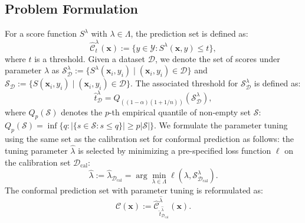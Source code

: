 \documentclass{article}
\newcommand{\C}{\mathcal{C}}
\newcommand{\1}{\mathbbm{1}}
\theoremstyle{plain}
\theoremstyle{definition}
\theoremstyle{remark}
\begin{document}
\subsection{Problem Formulation}
\label{subsec:tuning_bias}

For a score function $S^{\lambda}$ with $\lambda \in \Lambda$, the prediction set is defined as:
\begin{equation*}
    \widehat{\C}^{\lambda}_t(\boldsymbol{x}) := \{y \in \mathcal{Y} : S^\lambda(\boldsymbol{x},y) \leq t\},
\end{equation*}
where $t$ is a threshold. 
Given a dataset $\mathcal{D}$, we denote the set of scores under parameter $\lambda$ as $\mathcal{S}^{\lambda}_{\mathcal{D}} := \{S^\lambda(\boldsymbol{x}_i, y_i) \mid (\boldsymbol{x}_i, y_i) \in \mathcal{D}\}$ and $\mathcal{S}_{\mathcal{D}} := \{S(\boldsymbol{x}_i, y_i) \mid (\boldsymbol{x}_i, y_i) \in \mathcal{D}\}$. 
The associated threshold for $\mathcal{S}^{\lambda}_{\mathcal{D}}$ is defined as:
\begin{equation} \label{eq:threshold_reusing_data}
    \hat{t}^\lambda_\mathcal{D} = Q_{((1-\alpha)(1+1/n))}{(\mathcal{S}^{\lambda}_{\mathcal{D}})},
\end{equation}
where $Q_{p}(\mathcal{S})$ denotes the $p$-th empirical quantile of non-empty set $\mathcal{S}$: \(Q_{p}(\mathcal{S}) = \inf\{q: |\{s \in \mathcal{S}: s \leq q\}| \geq p |\mathcal{S}|\}\).
We formulate the parameter tuning using the same set as the calibration set for conformal prediction as follows: the tuning parameter $\hat{\lambda}$ is selected by minimizing a pre-specified loss function $\ell$ on the calibration set $\mathcal{D}_{\text{cal}}$:
\begin{equation*}
    \hat{\lambda} := \hat{\lambda}_{\mathcal{D}_{\text{cal}}} 
    = \arg\min_{\lambda \in \Lambda} \ell(\lambda, \mathcal{S}^{\lambda}_{\mathcal{D}_{\text{cal}}}). 
\end{equation*}
The conformal prediction set with parameter tuning is reformulated as: 
\begin{equation}\label{eq:reusing_data_cp}
    {\C}(\boldsymbol{x}) := \widehat{\C}^{\hat{\lambda}}_{\hat{t}^{\hat{\lambda}}_{\mathcal{D}_{\text{cal}}}}(\boldsymbol{x}).
\end{equation}
\end{document}
